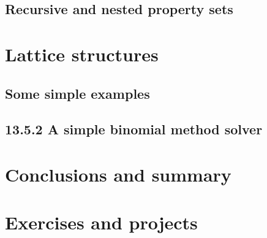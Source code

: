 \subsection{Recursive and nested property sets}

\section{Lattice structures}

\subsection{Some simple examples}
\subsection{13.5.2 A simple binomial method solver}

\section{Conclusions and summary}
\section{Exercises and projects}